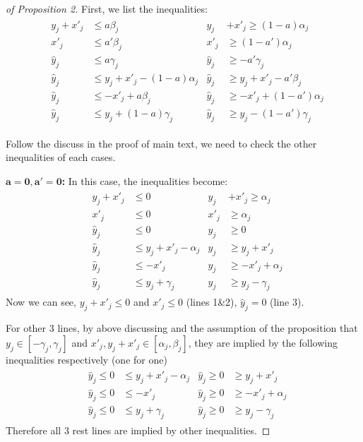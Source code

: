 \begin{proof}[of Proposition 2]
	First, we list the inequalities: \begin{align*}
		& \begin{aligned}
			y_j + x'_j &\leq a\beta_j        &
			y_j &+ x'_j \geq (1-a)\alpha_j \\
			x'_j       &\leq a'\beta_j       & 
			x'_j       &\geq (1-a')\alpha_j \\
			\hat{y}_j  &\leq a\gamma_j       &
			\hat{y}_j  &\geq -a'\gamma_j \\
			\hat{y}_j  &\leq y_j + x'_j - (1-a)\alpha_j &
			\hat{y}_j  &\geq y_j + x'_j - a'\beta_j \\
			\hat{y}_j  &\leq -x'_j + a\beta_j &
			\hat{y}_j  &\geq -x'_j + (1-a')\alpha_j \\
			\hat{y}_j  &\leq y_j + (1-a)\gamma_j  &
			\hat{y}_j  &\geq y_j - (1-a')\gamma_j
		\end{aligned}
	\end{align*} 
	
	Follow the discuss in the proof of main text, we need to check the other inequalities of each cases.
	
 \textbf{$\mathbf{a = 0, a' = 0}$:}  In this case, the inequalities become: \begin{align*}
 	& \begin{aligned}
 		y_j + x'_j &\leq 0       &
 		y_j &+ x'_j \geq \alpha_j \\
 		x'_j       &\leq 0       & 
 		x'_j       &\geq \alpha_j \\
 		\hat{y}_j  &\leq 0       &
 		\hat{y}_j  &\geq 0 \\
 		\hat{y}_j  &\leq y_j + x'_j -\alpha_j &
 		\hat{y}_j  &\geq y_j + x'_j  \\
 		\hat{y}_j  &\leq -x'_j  &
 		\hat{y}_j  &\geq -x'_j + \alpha_j \\
 		\hat{y}_j  &\leq y_j + \gamma_j  &
 		\hat{y}_j  &\geq y_j - \gamma_j
 	\end{aligned}
 \end{align*} Now we can see, $y_j+x'_j\leq 0$ and $x'_j \leq 0$ (lines 1\&2), $\hat{y}_j=0$ (line 3). 
 
 For other 3 lines, by above discussing and the assumption of the proposition that $y_j \in [-\gamma_j, \gamma_j]$ and $x'_j,y_j+x'_j \in [\alpha_j,\beta_j]$, they are implied by the following inequalities respectively (one for one) \begin{align*}
 & \begin{aligned}
 	\hat{y}_j  \leq 0 &\leq y_j + x'_j -\alpha_j &
 	\hat{y}_j  \geq 0 &\geq y_j + x'_j  \\
 	\hat{y}_j  \leq 0 &\leq -x'_j  &
 	\hat{y}_j  \geq 0 &\geq -x'_j + \alpha_j \\
 	\hat{y}_j  \leq 0 &\leq y_j + \gamma_j  &
 	\hat{y}_j  \geq 0 &\geq y_j - \gamma_j
 \end{aligned}
 \end{align*} Therefore all 3 rest lines are implied by other inequalities.
 

\end{proof}
